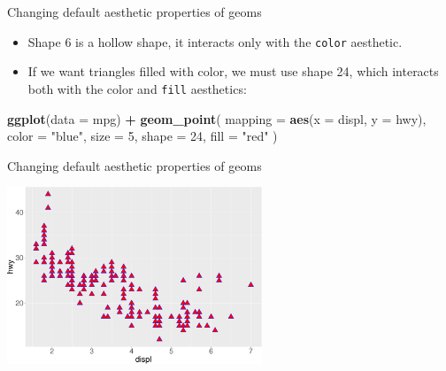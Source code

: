 \documentclass[ignorenonframetext,]{beamer}
\newenvironment{Shaded}{\begin{snugshade}}{\end{snugshade}}
\newcommand{\DataTypeTok}[1]{\textcolor[rgb]{0.13,0.29,0.53}{#1}}
\newcommand{\DecValTok}[1]{\textcolor[rgb]{0.00,0.00,0.81}{#1}}
\newcommand{\KeywordTok}[1]{\textcolor[rgb]{0.13,0.29,0.53}{\textbf{#1}}}
\newcommand{\NormalTok}[1]{#1}
\newcommand{\OperatorTok}[1]{\textcolor[rgb]{0.81,0.36,0.00}{\textbf{#1}}}
\newcommand{\StringTok}[1]{\textcolor[rgb]{0.31,0.60,0.02}{#1}}
\begin{document}
\begin{frame}[fragile]{Changing default aesthetic properties of geoms}
\protect\hypertarget{changing-default-aesthetic-properties-of-geoms-8}{}

\begin{itemize}
\item
  Shape 6 is a hollow shape, it interacts only with the \texttt{color}
  aesthetic.
\item
  If we want triangles filled with color, we must use shape 24, which
  interacts both with the color and \texttt{fill} aesthetics:
\end{itemize}

\begin{Shaded}
\begin{Highlighting}[]
\KeywordTok{ggplot}\NormalTok{(}\DataTypeTok{data =}\NormalTok{ mpg) }\OperatorTok{+}
\StringTok{  }\KeywordTok{geom_point}\NormalTok{(}
    \DataTypeTok{mapping =} \KeywordTok{aes}\NormalTok{(}\DataTypeTok{x =}\NormalTok{ displ, }\DataTypeTok{y =}\NormalTok{ hwy),}
    \DataTypeTok{color =} \StringTok{"blue"}\NormalTok{,}
    \DataTypeTok{size =} \DecValTok{5}\NormalTok{,}
    \DataTypeTok{shape =} \DecValTok{24}\NormalTok{,}
    \DataTypeTok{fill =} \StringTok{"red"}
\NormalTok{  )}
\end{Highlighting}
\end{Shaded}

\end{frame}

\begin{frame}{Changing default aesthetic properties of geoms}
\protect\hypertarget{changing-default-aesthetic-properties-of-geoms-9}{}

\begin{center}\includegraphics[height=200px]{data-visualization_files/figure-beamer/unnamed-chunk-45-1} \end{center}

\end{frame}
\end{document}

